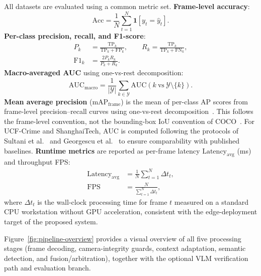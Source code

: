 \documentclass[sensors,article,submit,pdftex,moreauthors]{Definitions/mdpi}
\begin{document}
All datasets are evaluated using a common metric set. \textbf{Frame-level accuracy}:
\begin{equation}
\mathrm{Acc} = \frac{1}{N}\sum_{t=1}^{N}\mathbf{1}[y_t = \hat{y}_t].
\end{equation}
\textbf{Per-class precision, recall, and F1-score}:
\begin{equation}
\begin{aligned}
P_k &= \frac{\mathrm{TP}_k}{\mathrm{TP}_k + \mathrm{FP}_k}, \qquad
R_k = \frac{\mathrm{TP}_k}{\mathrm{TP}_k + \mathrm{FN}_k}, \\
\mathrm{F1}_k &= \frac{2P_kR_k}{P_k + R_k}.
\end{aligned}
\end{equation}
\textbf{Macro-averaged AUC} using one-vs-rest decomposition:
\begin{equation}
\mathrm{AUC}_{\text{macro}} = \frac{1}{|\mathcal{Y}|}\sum_{k \in \mathcal{Y}}\mathrm{AUC}(k\ \text{vs}\ \mathcal{Y}\setminus\{k\}).
\end{equation}
\textbf{Mean average precision} ($\mathrm{mAP}_{\mathrm{frame}}$) is the mean of per-class AP scores from frame-level precision--recall curves using one-vs-rest decomposition~\cite{manning2008introduction}. This follows the frame-level convention, not the bounding-box IoU convention of COCO~\cite{lin2014microsoft}. For UCF-Crime and ShanghaiTech, AUC is computed following the protocols of Sultani et al.~\cite{sultani2018realworld} and Georgescu et al.~\cite{georgescu2021anomaly} to ensure comparability with published baselines. \textbf{Runtime metrics} are reported as per-frame latency $\mathrm{Latency}_{\text{avg}}$ (ms) and throughput FPS:
\begin{equation}
\begin{aligned}
\mathrm{Latency}_{\text{avg}} &= \frac{1}{N}\sum_{t=1}^{N}\Delta t_t, \\[4pt]
\mathrm{FPS} &= \frac{N}{\sum_{t=1}^{N}\Delta t_t},
\end{aligned}
\end{equation}
where $\Delta t_t$ is the wall-clock processing time for frame $t$ measured on a standard CPU workstation without GPU acceleration, consistent with the edge-deployment target of the proposed system.
 
Figure~\ref{fig:pipeline-overview} provides a visual overview of all five processing stages (frame decoding, camera-integrity guards, context adaptation, semantic detection, and fusion/arbitration), together with the optional VLM verification path and evaluation branch.
 
\end{document}
